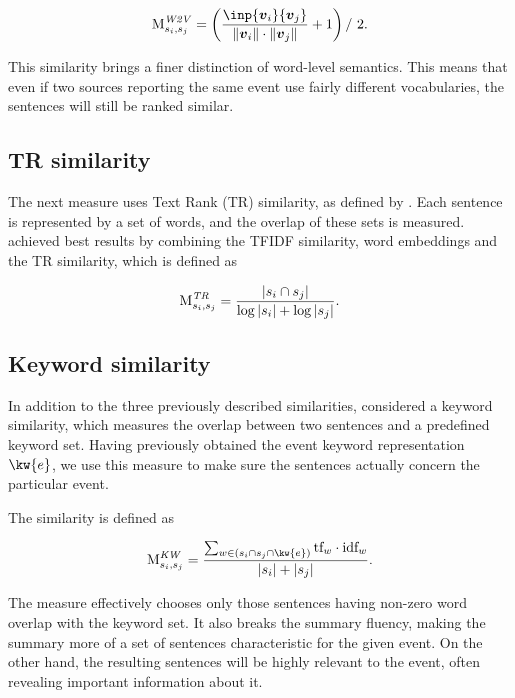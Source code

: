 \begin{equation}
	\similarity_{s_{i}, s_{j}}^{\mathit{W2V}} = \left(\frac{\inp{\embed_{i}}{\embed_{j}}}{\| \embed_{i} \| \cdot \| \embed_{j} \|} + 1 \right) / \ 2.
\end{equation}

This similarity brings a finer distinction of word-level semantics. This means that even if two sources reporting the same event use fairly different vocabularies, the sentences will still be ranked similar.

\subsection{TR similarity}

The next measure uses Text Rank (TR) similarity, as defined by \cite{textrank}. Each sentence is represented by a set of words, and the overlap of these sets is measured. \cite{mogren-2} achieved best results by combining the TFIDF similarity, word embeddings and the TR similarity, which is defined as

\begin{equation}
	\text{M}_{s_{i}, s_{j}}^{\mathit{TR}} = \frac{\left| s_{i} \cap s_{j} \right|}{\log{\left| s_{i} \right|} + \log{\left| s_{j} \right|}}.
\end{equation}


\subsection{Keyword similarity}

In addition to the three previously described similarities, \cite{mogren-2} considered a keyword similarity, which measures the overlap between two sentences and a predefined keyword set. Having previously obtained the event keyword representation $\kw{e}$, we use this measure to make sure the sentences actually concern the particular event.

The similarity is defined as 

\begin{equation}
	\similarity_{s_{i}, s_{j}}^{\mathit{KW}} = \frac{\sum_{w \in \left( s_{i} \cap s_{j} \cap \kw{e} \right)} \text{tf}_{w} \cdot \text{idf}_{w}}{\left| s_{i} \right| + \left| s_{j} \right|}.
\end{equation}

The measure effectively chooses only those sentences having non-zero word overlap with the keyword set. It also breaks the summary fluency, making the summary more of a set of sentences characteristic for the given event. On the other hand, the resulting sentences will be highly relevant to the event, often revealing important information about it.

